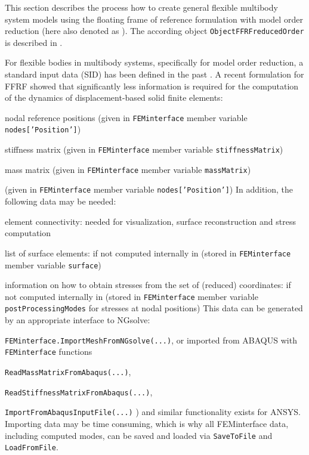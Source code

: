 This section describes the process how to create general flexible multibody system models using the floating frame of reference formulation with model order reduction (here also denoted as ). The according object \texttt{ObjectFFRFreducedOrder} is described in .

%
For flexible bodies in multibody systems, specifically for model order reduction, a standard input data (SID) has been defined in the past \cite{Schwertassek1999}.
A recent formulation for \ac{FFRF} \cite{ZwoelferGerstmayr2021} showed that significantly less information is required for the computation of the dynamics of displacement-based solid finite elements:
\bi
  \item nodal reference positions (given in \texttt{FEMinterface} member variable \texttt{nodes['Position']})
  \item stiffness matrix (given in \texttt{FEMinterface} member variable \texttt{stiffnessMatrix})
  \item mass matrix (given in \texttt{FEMinterface} member variable \texttt{massMatrix})
  \item (given in \texttt{FEMinterface} member variable \texttt{nodes['Position']})
\ei
In addition, the following data may be needed:
\bi
  \item element connectivity: needed for visualization, surface reconstruction and stress computation
  \item list of surface elements: if not computed internally in \codeName (stored in \texttt{FEMinterface} member variable \texttt{surface})
  \item information on how to obtain stresses from the set of (reduced) coordinates:  if not computed internally in \codeName (stored in \texttt{FEMinterface} member variable \texttt{postProcessingModes} for stresses at nodal positions)
\ei
This data can be generated by an appropriate interface to NGsolve:
\bi
  \item \texttt{FEMinterface.ImportMeshFromNGsolve(...)},
\ei
or imported from ABAQUS with \texttt{FEMinterface} functions
\bi
  \item \texttt{ReadMassMatrixFromAbaqus(...)}, 
  \item \texttt{ReadStiffnessMatrixFromAbaqus(...)}, 
  \item \texttt{ImportFromAbaqusInputFile(...)} )
\ei
and similar functionality exists for ANSYS.
Importing data may be time consuming, which is why all FEMinterface data, including computed modes, can be saved and loaded via
\texttt{SaveToFile} and \texttt{LoadFromFile}. 

